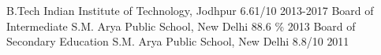 \begin{cvhonors}
  \cvhonor
    {B.Tech}
    {Indian Institute of Technology, Jodhpur}
    {6.61/10}
    {2013-2017}
  \cvhonor
    {Board of Intermediate}
    {S.M. Arya Public School, New Delhi}
    {88.6 \%}
    {2013}
    \cvhonor
    {Board of Secondary Education}
    {S.M. Arya Public School, New Delhi}
    {8.8/10}
    {2011}
\end{cvhonors}
